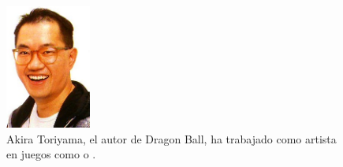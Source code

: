 \begin{figure}[h]
    \centering
    \includegraphics[width=0.25\textwidth]{images/estadodelarte/desarrollo/akira-toriyama}
    \caption{Akira Toriyama, el autor de Dragon Ball, ha trabajado como artista en juegos como  o .}
\end{figure}

